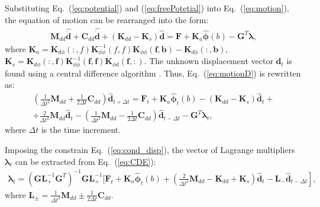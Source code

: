 \documentclass[sensors,article,submit,moreauthors,pdftex]{Definitions/mdpi}
\begin{document}
Substituting Eq.~(\ref{eq:potential}) and (\ref{eq:freePotetial}) into Eq.~(\ref{eq:motion}), the equation of motion can be rearranged into the form:
\begin{eqnarray}
\textbf{M}_{dd} \widehat{\ddot{\textbf{d}}} + \textbf{C}_{dd} \widehat{\dot{\textbf{d}}} + (\textbf{K}_{dd}-\textbf{K}_{s}) \widehat{\textbf{d}}  = \textbf{F} + \textbf{K}_{a} \widehat{\boldsymbol{\phi}}(b) - \textbf{G}^T \boldsymbol{\lambda},
\label{eq:motionD}
\end{eqnarray}
where  \(\textbf{K}_a=\textbf{K}_{d\phi}(:,f)\textbf{K}_{\phi \phi}^{-1}(f,f)\textbf{K}_{\phi \phi}(\textbf{f},\textbf{b})-\textbf{K}_{d\phi}(:,\textbf{b})\), \(\textbf{K}_s=\textbf{K}_{d \phi}(:,\textbf{f})\textbf{K}_{\phi \phi}^{-1}(\textbf{f},\textbf{f})\textbf{K}_{\phi d}(\textbf{f},:)\).
The unknown displacement vector \(\widehat{\textbf{d}}_t\) is found using a central difference algorithm \cite{kudela20093d}.
Thus, Eq.~(\ref{eq:motionD}) is rewritten as:
\begin{eqnarray}
\left(\frac{1}{\Delta t^2}\textbf{M}_{dd}+\frac{1}{2\Delta t}\textbf{C}_{dd} \right)\widehat{\textbf{d}}_{t+\Delta t}=
\textbf{F}_t+\textbf{K}_a\widehat{\boldsymbol{\phi}}_t(b)-\left( \textbf{K}_{dd}-\textbf{K}_s\right)\widehat{\textbf{d}}_t+\nonumber\\
+\frac{2}{\Delta t^2}\textbf{M}_{dd}\widehat{\textbf{d}}_t-\left(\frac{1}{\Delta t^2}\textbf{M}_{dd}-\frac{1}{2\Delta t}\textbf{C}_{dd}\right)\widehat{\textbf{d}}_{t-\Delta t}-\textbf{G}^T\boldsymbol{\lambda}_t,
\label{eq:CDE}
\end{eqnarray}
where \(\Delta t\) is the time increment.

Imposing the constrain Eq.~(\ref{eq:cond_disp}), the vector of Lagrange multipliers \(\boldsymbol{\lambda}_t\) can be extracted from Eq.~(\ref{eq:CDE}): 
\begin{eqnarray}
\boldsymbol{\lambda}_t = {\left(\textbf{G}\textbf{L}_+^{-1}\textbf{G}^T \right)}^{-1}\textbf{G}\textbf{L}_+^{-1} \Bigg[ \textbf{F}_t+\textbf{K}_a\widehat{\boldsymbol{\phi}}_t(b)+\left.\left(\frac{2}{\Delta t^2}\textbf{M}_{dd}-\textbf{K}_{dd}+\textbf{K}_s\right)\widehat{\textbf{d}}_t -\textbf{L}_-\widehat{\textbf{d}}_{t-\Delta t} \right],
\label{eq:lambda}
\end{eqnarray}
where \(\textbf{L}_{\pm}=\frac{1}{\Delta t^2}\textbf{M}_{dd}\pm\frac{1}{2\Delta t}\textbf{C}_{dd}\).
\end{document}
